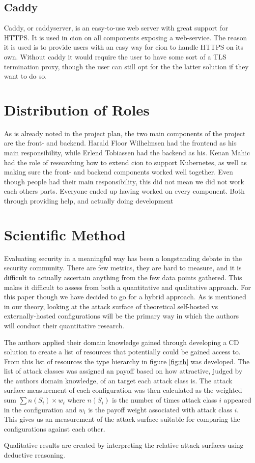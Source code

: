 \subsection{Caddy}
Caddy, or caddyserver, is an easy-to-use web server with great support for HTTPS\cite{caddyserver}. It is used in cion on all components exposing a web-service. The reason it is used is to provide users with an easy way for cion to handle HTTPS on its own. Without caddy it would require the user to have some sort of a TLS termination proxy, though the user can still opt for the the latter solution if they want to do so.

\section{Distribution of Roles}
As is already noted in the project plan, the two main components of the project are the front- and backend. Harald Floor Wilhelmsen had the frontend as his main responsibility, while Erlend Tobiassen had the backend as his. Kenan Mahic had the role of researching how to extend cion to support Kubernetes, as well as making sure the front- and backend components worked well together. Even though people had their main responsibility, this did not mean we did not work each others parts. Everyone ended up having worked on every component. Both through providing help, and actually doing development 

\section{Scientific Method}
Evaluating security in a meaningful way has been a longstanding debate in the security community. There are few metrics, they are hard to measure, and it is difficult to actually ascertain anything from the few data points gathered. This makes it difficult to assess from both a quantitative and qualitative approach. For this paper though we have decided to go for a hybrid approach. As is mentioned in our theory, looking at the attack surface of theoretical self-hosted vs externally-hosted configurations will be the primary way in which the authors will conduct their quantitative research.

The authors applied their domain knowledge gained through developing a \acrshort{CD} solution to create a list of resources that potentially could be gained access to. From this list of resources the type hierarchy in figure \ref{fig:th} was developed. The list of attack classes was assigned an payoff based on how attractive, judged by the authors domain knowledge, of an target each attack class is. The attack surface measurement of each configuration was then calculated as the weighted sum $\sum n(S_i)\times w_i$ where $n(S_i)$ is the number of times attack class $i$ appeared in the configuration and $w_i$ is the payoff weight associated with attack class $i$. This gives us an measurement of the attack surface suitable for comparing the configurations against each other.

Qualitative results are created by interpreting the relative attack surfaces using deductive reasoning.